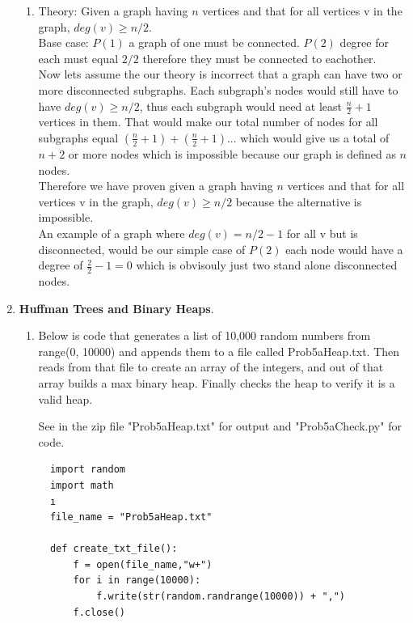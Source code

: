 \documentclass{article}
\begin{document}
\begin{enumerate}
\begin{enumerate}
      \item Theory: Given a graph having $n$ vertices and that for all vertices v in the graph, $deg(v) \geq n/2$.\\
      
      Base case: $P(1)$ a graph of one must be connected. $P(2)$ degree for each must equal $2/2$ therefore they must be connected to eachother.\\

      Now lets assume the our theory is incorrect that a graph can have two or more disconnected subgraphs. Each subgraph's nodes would still have to have $deg(v) \geq n/2$, thus each subgraph would need at least $\frac{n}{2} + 1$ vertices in them.
      That would make our total number of nodes for all subgraphs equal $(\frac{n}{2} + 1) + (\frac{n}{2} + 1) ...$ which would give us a total of $n + 2$ or more nodes which is impossible because our graph is defined as $n$ nodes.\\

      Therefore we have proven given a graph having $n$ vertices and that for all vertices v in the graph, $deg(v) \geq n/2$ because the alternative is impossible.\\

      An example of a graph where $deg(v) = n/2 -1$ for all v but is disconnected, would be our simple case of $P(2)$ each node would have a degree of $\frac{2}{2} - 1 = 0$ which is obvisouly just two stand alone disconnected nodes.
    \end{enumerate}

    \item \textbf{Huffman Trees and Binary Heaps}.
    
    \begin{enumerate}
      
      \item Below is code that generates a list of 10,000 random numbers from range(0, 10000) and appends them to a file called Prob5aHeap.txt. 
            Then reads from that file to create an array of the integers, and out of that array builds a max binary heap. 
            Finally checks the heap to verify it is a valid heap.

            See in the zip file "Prob5aHeap.txt" for output and "Prob5aCheck.py" for code.
        \begin{lstlisting}
  import random
  import math     
  ı
  file_name = "Prob5aHeap.txt"

  def create_txt_file():
      f = open(file_name,"w+")
      for i in range(10000):
          f.write(str(random.randrange(10000)) + ",")
      f.close()
  

\end{lstlisting}
\end{enumerate}
\end{enumerate}
\end{document}
